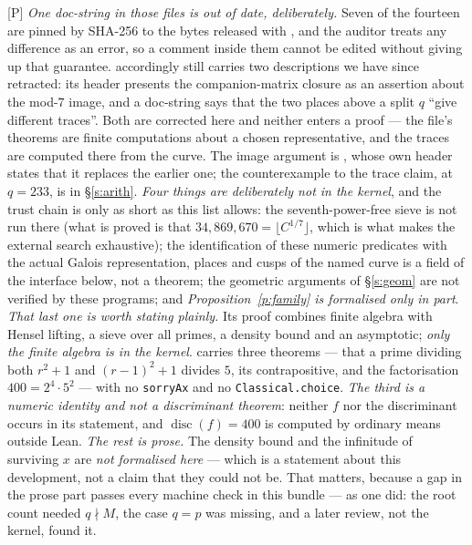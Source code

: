 \documentclass[11pt]{article}
\theoremstyle{plain}
\theoremstyle{definition}
\begin{document}
\textup{[P]} \emph{One doc-string in those files is out of date, deliberately.}  Seven
of the fourteen are pinned by SHA-256 to the bytes released with \cite{First}, and the
auditor treats any difference as an error, so a comment inside them cannot be edited
without giving up that guarantee.   accordingly still carries two descriptions we have since
retracted: its header presents the companion-matrix closure as an assertion about the
mod-$7$ image, and a doc-string says that the two places above a split $q$ ``give
different traces''.  Both are corrected here and neither enters a proof --- the file's
theorems are finite computations about a chosen representative, and the traces are
computed there from the curve.  The image argument is , whose
own header states that it replaces the earlier one; the counterexample to the trace
claim, at $q=233$, is in \S\ref{s:arith}.
\emph{Four things are deliberately not in the kernel}, and the trust chain is only as
short as this list allows: the seventh-power-free sieve is not run there (what is
proved is that $34{,}869{,}670=\lfloor C^{1/7}\rfloor$, which is what makes the
external search exhaustive); the identification of these numeric predicates with the
actual Galois representation, places and cusps of the named curve is a field of the
interface below, not a theorem; the geometric arguments of \S\ref{s:geom} are not
verified by these programs; and \emph{Proposition~\ref{p:family} is formalised only in
part}.  \emph{That last one is worth stating plainly.}  Its proof combines finite
algebra with Hensel lifting, a sieve over all primes, a density bound and an
asymptotic; \emph{only the finite algebra is in the kernel}.
 carries three theorems --- that a prime dividing both
$r^2+1$ and $(r-1)^2+1$ divides $5$, its contrapositive, and the factorisation
$400=2^4\cdot5^2$ --- with no \texttt{sorryAx} and no \texttt{Classical.choice}.
\emph{The third is a numeric identity and not a discriminant theorem}: neither $f$ nor
the discriminant occurs in its statement, and $\operatorname{disc}(f)=400$ is computed
by ordinary means outside Lean.  \emph{The rest is prose.}  The density bound and the
infinitude of surviving $x$ are \emph{not formalised here} --- which is a statement
about this development, not a claim that they could not be.  That matters, because a gap in the prose part
passes every machine check in this bundle --- as one did: the root count needed
$q\nmid M$, the case $q=p$ was missing, and a later review, not the kernel, found it.
\end{document}
